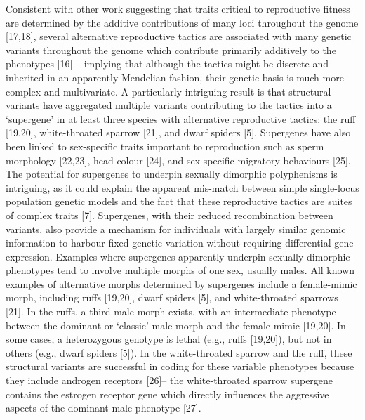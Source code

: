 \documentclass[
  11pt,
  a4paper,
]{article}
\begin{document}
Consistent with other work suggesting that traits critical to
reproductive fitness are determined by the additive contributions of
many loci throughout the genome {[}17,18{]}, several alternative
reproductive tactics are associated with many genetic variants
throughout the genome which contribute primarily additively to the
phenotypes {[}16{]} -- implying that although
the tactics might be discrete and inherited in an apparently Mendelian
fashion, their genetic basis is much more complex and multivariate. A
particularly intriguing result is that structural variants have
aggregated multiple variants contributing to the tactics into a
`supergene' in at least three species with alternative reproductive
tactics: the ruff {[}19,20{]}, white-throated sparrow
{[}21{]}, and dwarf spiders
{[}5{]}. Supergenes have also
been linked to sex-specific traits important to reproduction such as
sperm morphology {[}22,23{]}, head colour
{[}24{]}, and sex-specific migratory
behaviours {[}25{]}. The potential
for supergenes to underpin sexually dimorphic polyphenisms is
intriguing, as it could explain the apparent mis-match between simple
single-locus population genetic models and the fact that these
reproductive tactics are suites of complex traits
{[}7{]}. Supergenes, with their reduced
recombination between variants, also provide a mechanism for individuals
with largely similar genomic information to harbour fixed genetic
variation without requiring differential gene expression. Examples where
supergenes apparently underpin sexually dimorphic phenotypes tend to
involve multiple morphs of one sex, usually males. All known examples of
alternative morphs determined by supergenes include a female-mimic
morph, including ruffs {[}19,20{]}, dwarf spiders
{[}5{]}, and white-throated
sparrows {[}21{]}. In the ruffs, a
third male morph exists, with an intermediate phenotype between the
dominant or `classic' male morph and the female-mimic
{[}19,20{]}. In some cases, a heterozygous
genotype is lethal (e.g., ruffs {[}19,20{]}), but not in others (e.g.,
dwarf spiders {[}5{]}). In the
white-throated sparrow and the ruff, these structural variants are
successful in coding for these variable phenotypes because they include
androgen receptors {[}26{]}-- the white-throated
sparrow supergene contains the estrogen receptor gene which directly
influences the aggressive aspects of the dominant male phenotype
{[}27{]}.
\end{document}
